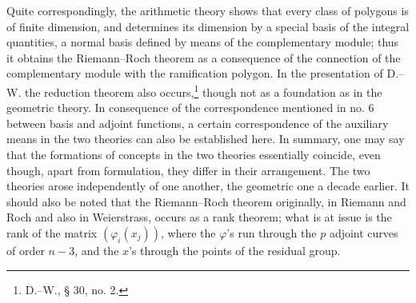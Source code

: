 \documentclass[11pt]{article}
\begin{document}
Quite correspondingly, the arithmetic theory shows that every class of polygons is of finite dimension, and determines its dimension by a special basis of the integral quantities, a normal basis defined by means of the complementary module; thus it obtains the Riemann--Roch theorem as a consequence of the connection of the complementary module with the ramification polygon. In the presentation of D.--W. the reduction theorem also occurs,\footnote{D.--W., § 30, no. 2.} though not as a foundation as in the geometric theory. In consequence of the correspondence mentioned in no. 6 between basis and adjoint functions, a certain correspondence of the auxiliary means in the two theories can also be established here. In summary, one may say that the formations of concepts in the two theories essentially coincide, even though, apart from formulation, they differ in their arrangement. The two theories arose independently of one another, the geometric one a decade earlier. It should also be noted that the Riemann--Roch theorem originally, in Riemann and Roch and also in Weierstrass, occurs as a rank theorem; what is at issue is the rank of the matrix \((\varphi_i(x_j))\), where the \(\varphi\)'s run through the \(p\) adjoint curves of order \(n-3\), and the \(x\)'s through the points of the residual group.
\end{document}
